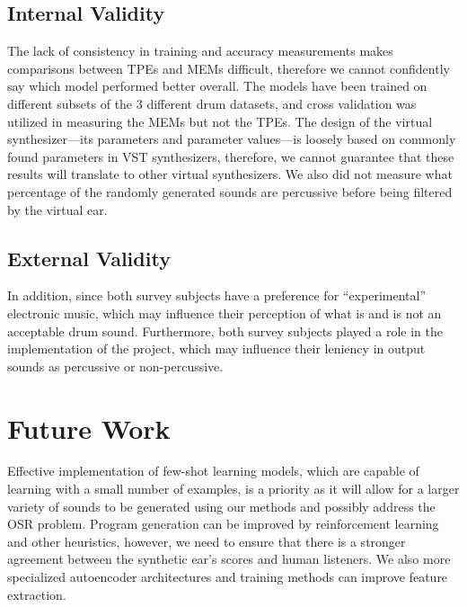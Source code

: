 \documentclass[\main/thesis.tex]{subfiles}
\begin{document}
\subsection{Internal Validity}
 The lack of consistency in training and accuracy measurements makes comparisons between TPEs and MEMs difficult, therefore we cannot confidently say which model performed better overall. The models have been trained on different subsets of the 3 different drum datasets, and cross validation was utilized in measuring the MEMs but not the TPEs. The design of the virtual synthesizer---its parameters and parameter values---is loosely based on commonly found parameters in VST synthesizers, therefore, we cannot guarantee that these results will translate to other virtual synthesizers. We also did not measure what percentage of the randomly generated sounds are percussive before being filtered by the virtual ear. 
\subsection{External Validity}
 In addition, since both survey subjects have a preference for \enquote{experimental} electronic music, which may influence their perception of what is and is not an acceptable drum sound. Furthermore, both survey subjects played a role in the implementation of the project, which may influence their leniency in output sounds as percussive or non-percussive. 

  
\section{Future Work} Effective implementation of few-shot learning models, which are capable of learning with a small number of examples, is a priority as it will allow for a larger variety of sounds to be generated using our methods and possibly address the OSR problem. Program generation can be improved by reinforcement learning and other heuristics, however, we need to ensure that there is a stronger agreement between the synthetic ear's scores and human listeners. We also more specialized autoencoder architectures and training methods can improve feature extraction.
\end{document}
